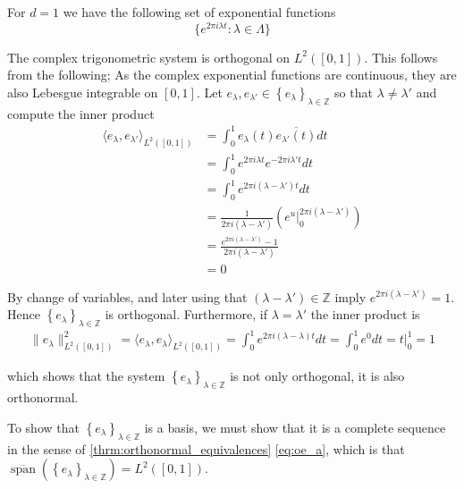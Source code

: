 \documentclass[../thesis.tex]{subfiles}
\begin{document}
For $d=1$ we have the following set of exponential functions
\begin{equation}
    \{ e^{2\pi i \lambda t } : \lambda \in \Lambda\}
\end{equation}

The complex trigonometric system is orthogonal on $L^2([0,1])$. This follows from the following; As the complex exponential functions are continuous, they are also Lebesgue integrable on $[0,1]$. Let $e_{\lambda}, e_{\lambda'} \in \left\{ e_{\lambda} \right\}_{\lambda\in \mathbb{Z}}$ so that $\lambda \neq \lambda'$ and compute the inner product
\begin{align*} 
\langle e_{\lambda},e_{\lambda'} \rangle_{L^2([0,1])} 
&= \int_0^1 e_{\lambda}(t)\overline{e_{\lambda'}(t)} dt\\ &= \int_0^1 e^{2 \pi i {\lambda}t} e^{-2 \pi i {\lambda'}t} dt\\
&= \int_0^1 e^{2 \pi i (\lambda-\lambda')t} dt\\
&=\frac{1}{2 \pi i (\lambda-\lambda')}\left( e^u  \big| _0^{2 \pi i (\lambda-\lambda')}\right)\\
&=\frac{e^{2 \pi i (\lambda-\lambda')}-1}{2 \pi i (\lambda-\lambda')}\\
&= 0
\end{align*}

By change of variables, and later using that $(\lambda-\lambda') \in \mathbb{Z}$ imply $e^{2 \pi i (\lambda-\lambda')} = 1$. Hence $\left\{ e_{\lambda} \right\}_{\lambda\in \mathbb{Z}}$ is orthogonal. Furthermore, if  $\lambda =\lambda'$ the inner product is
\begin{align}\label{eq:exp_norm_one}
    \| e_\lambda \|^2_{L^2([0,1])} 
    = \langle e_{\lambda},e_{\lambda} \rangle_{L^2([0,1])} 
    = \int_0^1 e^{2 \pi i (\lambda-\lambda)t} dt
    = \int_0^1 e^{0} dt = t  \big| _0^{1}= 1
\end{align}

which shows that the system $\left\{ e_{\lambda} \right\}_{\lambda\in \mathbb{Z}}$ is not only orthogonal, it is also orthonormal. 


To show that $\left\{ e_{\lambda} \right\}_{\lambda\in \mathbb{Z}}$ is a basis, we must show that it is a complete sequence in the sense of \cref{thrm:orthonormal_equivalences} \cref{eq:oe_a}, which is that $\overline{\operatorname{span}} \left( \left\{ e_{\lambda} \right\}_{\lambda\in \mathbb{Z}} \right) = L^2{([0,1])}$.
\end{document}
